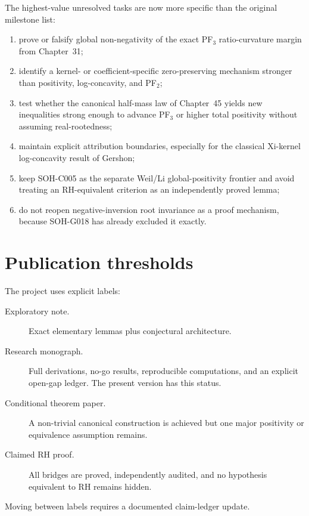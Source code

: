 The highest-value unresolved tasks are now more specific than the original milestone list:
\begin{enumerate}
  \item prove or falsify global non-negativity of the exact PF$_3$ ratio-curvature margin from Chapter~31;
  \item identify a kernel- or coefficient-specific zero-preserving mechanism stronger than positivity, log-concavity, and PF$_2$;
  \item test whether the canonical half-mass law of Chapter~45 yields new inequalities strong enough to advance PF$_3$ or higher total positivity without assuming real-rootedness;
  \item maintain explicit attribution boundaries, especially for the classical Xi-kernel log-concavity result of Gershon;
  \item keep SOH-C005 as the separate Weil/Li global-positivity frontier and avoid treating an RH-equivalent criterion as an independently proved lemma;
  \item do not reopen negative-inversion root invariance as a proof mechanism, because SOH-G018 has already excluded it exactly.
\end{enumerate}

\section{Publication thresholds}

The project uses explicit labels:
\begin{description}
  \item[Exploratory note.] Exact elementary lemmas plus conjectural architecture.
  \item[Research monograph.] Full derivations, no-go results, reproducible computations, and an explicit open-gap ledger. The present version has this status.
  \item[Conditional theorem paper.] A non-trivial canonical construction is achieved but one major positivity or equivalence assumption remains.
  \item[Claimed RH proof.] All bridges are proved, independently audited, and no hypothesis equivalent to RH remains hidden.
\end{description}
Moving between labels requires a documented claim-ledger update.

